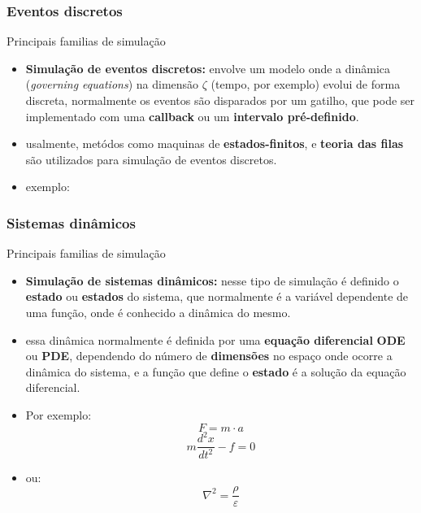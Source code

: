 \documentclass{beamer}
\begin{document}
	\subsubsection{Eventos discretos}
	\begin{frame}{Principais familias de simulação}
		\begin{itemize}[<+->]
			\item \textbf{Simulação de eventos discretos:} envolve um modelo onde a dinâmica (\emph{governing equations}) na dimensão $\zeta$ (tempo, por exemplo) evolui de forma discreta, normalmente os eventos são disparados por um gatilho, que pode ser implementado com uma \textbf{callback} ou um \textbf{intervalo pré-definido}.
			\item usalmente, metódos como maquinas de \textbf{estados-finitos}, e \textbf{teoria das filas} são utilizados para simulação de eventos discretos.
			\item exemplo:
			\centering
		\end{itemize}

	\end{frame}
	\subsubsection{Sistemas dinâmicos}
	\begin{frame}{Principais familias de simulação}
		\begin{itemize}[<+->]
			\item \textbf{Simulação de sistemas dinâmicos:} nesse tipo de simulação é definido o \textbf{estado} ou \textbf{estados} do sistema, que normalmente é a variável dependente de uma função, onde é conhecido a dinâmica do mesmo.
			\item essa dinâmica normalmente é definida por uma \textbf{equação diferencial} \textbf{ODE} ou \textbf{PDE}, dependendo do número de \textbf{dimensões} no espaço onde ocorre a dinâmica do sistema, e a função que define o \textbf{estado} é a solução da equação diferencial.
			\item Por exemplo:
			\begin{equation}
				F = m \cdot a
			\end{equation}			
			\begin{equation}
				m\frac{d^2x}{dt^2} - f = 0
			\end{equation}
			\item ou:
			\begin{equation}
				\nabla^2=\frac{\rho}{\varepsilon}
			\end{equation}
		\end{itemize}
	\end{frame}
\end{document}
